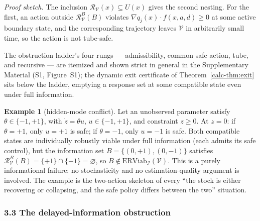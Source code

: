 \documentclass[10pt,twocolumn]{article}
\theoremstyle{definition}
\newtheorem{example}{Example}
\begin{document}
\emph{Proof sketch.} The inclusion \(\mathcal{R}_{\mathcal{V}}(x) \subseteq U(x)\) gives the second nesting. For the first, an action outside \(\mathcal{R}_{\mathcal{V}}^B(B)\) violates \(\nabla q_j(x) \cdot f(x, a, d) \ge 0\) at some active boundary state, and the corresponding trajectory leaves \(\mathcal{V}\) in arbitrarily small time, so the action is not tube-safe.

The obstruction ladder's four rungs --- admissibility, common safe-action, tube, and recursive --- are itemized and shown strict in general in the Supplementary Material (S1, Figure~S1); the dynamic exit certificate of Theorem~\ref{calc-thm:exit} sits below the ladder, emptying a response set at some compatible state even under full information.

\begin{example}[hidden-mode conflict]\label{calc-ex:hidden-mode} Let an unobserved parameter satisfy
\(\theta \in \{-1, +1\}\), with \(\dot z = \theta u\),
\(u \in \{-1, +1\}\), and constraint \(z \ge 0\). At \(z = 0\): if
\(\theta = +1\), only \(u = +1\) is safe; if \(\theta = -1\), only
\(u = -1\) is safe. Both compatible states are individually robustly
viable under full information (each admits its safe control), but the
information set \(B = \{(0, +1), (0, -1)\}\) satisfies
\(\mathcal{R}_{\mathcal{V}}^B(B) = \{+1\} \cap \{-1\} = \varnothing\),
so \(B \notin \mathrm{ERViab}_{\mathcal{I}}(\mathcal{V})\). This is a
purely informational failure: no stochasticity and no estimation-quality
argument is involved. The example is the two-action skeleton of every
``the stock is either recovering or collapsing, and the safe policy
differs between the two'' situation.

\end{example}

\subsubsection{3.3 The delayed-information
obstruction}\label{calc-the-delayed-information-obstruction}
\end{document}
